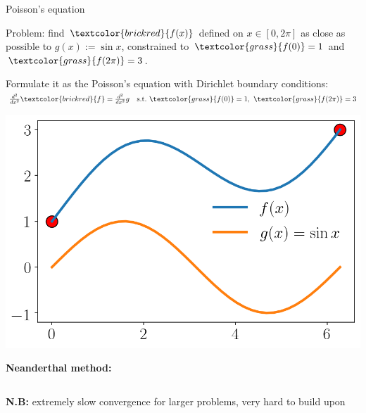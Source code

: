 \documentclass[UKenglish,aspectratio=169]{beamer}
\newcommand\unknown[1]{\textcolor{brickred}{#1}}
\newcommand\known[1]{\textcolor{grass}{#1}}
\begin{document}
\begin{frame}{Poisson's equation}
\begin{minipage}{.45\linewidth}
Problem: find $\unknown{f(x)}$ defined on $x\in[0,2\pi]$ as close as possible to $g(x):=\sin x$, constrained to $\known{f(0)}=1$ and $\known{f(2\pi)} = 3$.

\vspace{5pt}
Formulate it as the Poisson's equation with Dirichlet boundary conditions:\\
$
\frac{d^2}{dx^2}\unknown{f}  = \frac{d^2}{dx^2} g \quad \text{s.t.~} \known{f(0)}=1,~\known{f(2\pi)} = 3
$
\end{minipage}
\qquad
\begin{minipage}{.4\linewidth}
\centerline{\includegraphics[width=.8\linewidth]{../manuscript/img/pie-1d.png}}
\end{minipage}

\pause

\vspace{5pt}
\textbf{Neanderthal method:}
\inputminted[fontsize=\scriptsize,frame=single]{python}{listings/poisson-1d-gauss-seidel.py}

\textbf{N.B:} extremely slow convergence for larger problems, very hard to build upon
\end{frame}
\end{document}
